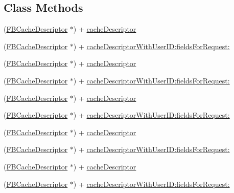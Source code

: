 \subsection*{Class Methods}
\begin{DoxyCompactItemize}
\item 
(\hyperlink{interfaceFBCacheDescriptor}{F\+B\+Cache\+Descriptor} $\ast$) + \hyperlink{interfaceFBFriendPickerViewController_afdb5497a310ae6cdc8ede333659a33dd}{cache\+Descriptor}
\item 
(\hyperlink{interfaceFBCacheDescriptor}{F\+B\+Cache\+Descriptor} $\ast$) + \hyperlink{interfaceFBFriendPickerViewController_a64d705a35ce97ceb5ef7eb7b54a8f503}{cache\+Descriptor\+With\+User\+I\+D\+:fields\+For\+Request\+:}
\item 
(\hyperlink{interfaceFBCacheDescriptor}{F\+B\+Cache\+Descriptor} $\ast$) + \hyperlink{interfaceFBFriendPickerViewController_afdb5497a310ae6cdc8ede333659a33dd}{cache\+Descriptor}
\item 
(\hyperlink{interfaceFBCacheDescriptor}{F\+B\+Cache\+Descriptor} $\ast$) + \hyperlink{interfaceFBFriendPickerViewController_a64d705a35ce97ceb5ef7eb7b54a8f503}{cache\+Descriptor\+With\+User\+I\+D\+:fields\+For\+Request\+:}
\item 
(\hyperlink{interfaceFBCacheDescriptor}{F\+B\+Cache\+Descriptor} $\ast$) + \hyperlink{interfaceFBFriendPickerViewController_afdb5497a310ae6cdc8ede333659a33dd}{cache\+Descriptor}
\item 
(\hyperlink{interfaceFBCacheDescriptor}{F\+B\+Cache\+Descriptor} $\ast$) + \hyperlink{interfaceFBFriendPickerViewController_a64d705a35ce97ceb5ef7eb7b54a8f503}{cache\+Descriptor\+With\+User\+I\+D\+:fields\+For\+Request\+:}
\item 
(\hyperlink{interfaceFBCacheDescriptor}{F\+B\+Cache\+Descriptor} $\ast$) + \hyperlink{interfaceFBFriendPickerViewController_afdb5497a310ae6cdc8ede333659a33dd}{cache\+Descriptor}
\item 
(\hyperlink{interfaceFBCacheDescriptor}{F\+B\+Cache\+Descriptor} $\ast$) + \hyperlink{interfaceFBFriendPickerViewController_a64d705a35ce97ceb5ef7eb7b54a8f503}{cache\+Descriptor\+With\+User\+I\+D\+:fields\+For\+Request\+:}
\item 
(\hyperlink{interfaceFBCacheDescriptor}{F\+B\+Cache\+Descriptor} $\ast$) + \hyperlink{interfaceFBFriendPickerViewController_afdb5497a310ae6cdc8ede333659a33dd}{cache\+Descriptor}
\item 
(\hyperlink{interfaceFBCacheDescriptor}{F\+B\+Cache\+Descriptor} $\ast$) + \hyperlink{interfaceFBFriendPickerViewController_a64d705a35ce97ceb5ef7eb7b54a8f503}{cache\+Descriptor\+With\+User\+I\+D\+:fields\+For\+Request\+:}
\end{DoxyCompactItemize}
